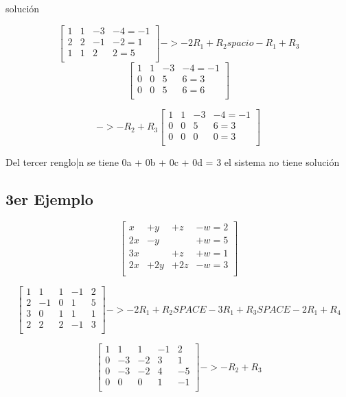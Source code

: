 \documentclass{article}
\begin{document}
solución

\[
    \begin{bmatrix}

         1 & 1 & -3 & -4 = -1  \\
         2& 2 & -1 & -2 = 1  \\
         1 & 1 & 2 &   2  =5 \\

    \end{bmatrix}
    -> -2R_1 +R_2 spacio -R_1+R_3
    \]
    \[
        \begin{bmatrix}
            1 & 1 & -3 & -4 = -1  \\
            0& 0 & 5 & 6 = 3  \\
            0 & 0 & 5 &  6  =6 \\
        \end{bmatrix}
        \]

        \[
    -> -R_2 +R_3
    \begin{bmatrix}
         1 & 1 & -3 & -4 = -1  \\
         0& 0 & 5 & 6 = 3  \\
         0 & 0 & 0 &  0  =3 \\
    \end{bmatrix}
\]

Del tercer renglo|n se tiene 0a + 0b + 0c + 0d = 3
el  sistema no tiene solución


\subsection{3er Ejemplo}
\[
\begin{bmatrix}
 x & +y & +z & -w = 2  \\
 2x& -y &  & +w = 5 \\
 3x &  & +z &+ w    =1 \\
 2x & +2y & +2z &  -w  =3 \\
\end{bmatrix}
\]

\[
\begin{bmatrix}
 1 & 1 & 1 & -1 &  2 \\
 2& -1 & 0 & 1  & 5 \\
 3 & 0 & 1 & 1  &   1 \\
 2 & 2 & 2 &  -1&   3 \\
\end{bmatrix}
 -> -2R_1 + R_2 SPACE -3R_1 + R_3 SPACE -2R_1 + R_4
\]


\[
\begin{bmatrix}
 1 & 1 & 1 & -1  & 2  \\
 0& -3 & -2 & 3  & 1 \\
 0 & -3 & -2 & 4   &  -5 \\
 0 & 0 & 0 &  1 &  -1 \\
\end{bmatrix}
-> -R_2+R_3
\]
\end{document}
